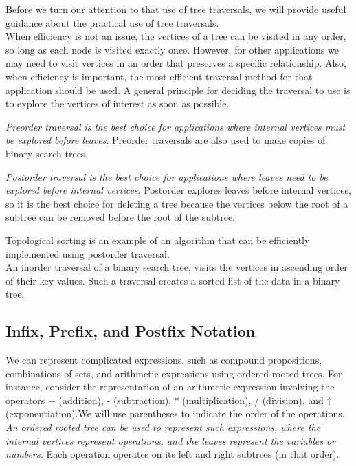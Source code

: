 \documentclass{article}
\begin{document}
Before we turn our attention to that use of tree traversals,
we will provide useful guidance about the practical use of tree traversals.\\

When efficiency is not an issue, the vertices of a tree can be visited in any order, so long as each node is visited exactly once. However, for other applications we may need to visit vertices in an order that preserves a specific relationship. Also, when efficiency is important, the most efficient traversal method for that application should be used. A general principle for deciding the traversal to use is to explore the vertices of interest as soon as possible.

\textit{Preorder traversal is the best choice for applications where internal vertices must be explored before leaves}. Preorder traversals are also used to make copies of binary search trees.

\textit{Postorder traversal is the best choice for applications where leaves need to be explored before internal vertices}. Postorder explores leaves before internal vertices, so it is the best choice for deleting a tree because the vertices below the root of a subtree can be removed before the root of the subtree. 

Topological sorting is an example of an algorithm that can be efficiently implemented using postorder traversal.\\

An inorder traversal of a binary search tree, visits the vertices in ascending order of their key values. Such a traversal creates a sorted list of the data in a binary tree.

\subsection{Infix, Prefix, and Postfix Notation}

We can represent complicated expressions, such as compound propositions, combinations of sets, and arithmetic expressions using ordered rooted trees. For instance, consider the representation of an arithmetic expression involving the operators + (addition), - (subtraction), * (multiplication), / (division), and ↑ (exponentiation).We will use parentheses to indicate the order of the operations. \textit{An ordered rooted tree can be used to represent such expressions, where the internal vertices represent operations, and the leaves represent the variables or numbers.} Each operation operates on its left and right subtrees (in that order).
\end{document}
